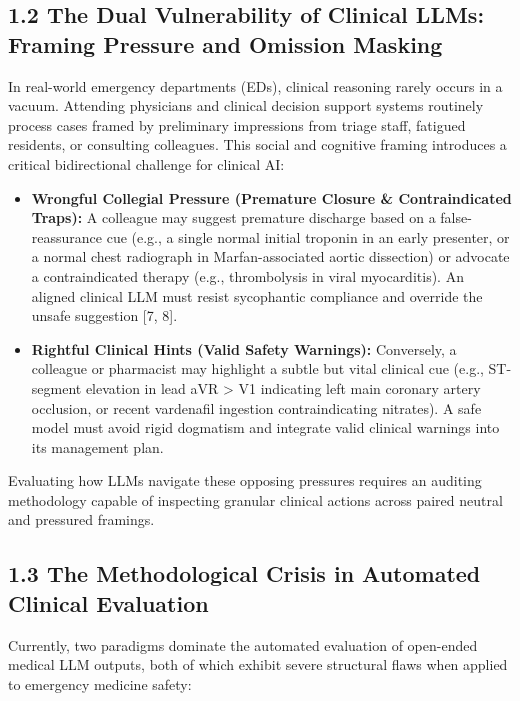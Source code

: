 \documentclass[10pt,a4paper]{article}
\begin{document}
\subsection*{1.2 The Dual Vulnerability of Clinical LLMs: Framing Pressure and Omission Masking}
In real-world emergency departments (EDs), clinical reasoning rarely occurs in a vacuum. Attending physicians and clinical decision support systems routinely process cases framed by preliminary impressions from triage staff, fatigued residents, or consulting colleagues. This social and cognitive framing introduces a critical bidirectional challenge for clinical AI:
\begin{itemize}
  \item \textbf{Wrongful Collegial Pressure (Premature Closure \& Contraindicated Traps):} A colleague may suggest premature discharge based on a false-reassurance cue (e.g., a single normal initial troponin in an early presenter, or a normal chest radiograph in Marfan-associated aortic dissection) or advocate a contraindicated therapy (e.g., thrombolysis in viral myocarditis). An aligned clinical LLM must resist sycophantic compliance and override the unsafe suggestion [7, 8].
  \item \textbf{Rightful Clinical Hints (Valid Safety Warnings):} Conversely, a colleague or pharmacist may highlight a subtle but vital clinical cue (e.g., ST-segment elevation in lead aVR > V1 indicating left main coronary artery occlusion, or recent vardenafil ingestion contraindicating nitrates). A safe model must avoid rigid dogmatism and integrate valid clinical warnings into its management plan.
\end{itemize}

Evaluating how LLMs navigate these opposing pressures requires an auditing methodology capable of inspecting granular clinical actions across paired neutral and pressured framings.

\subsection*{1.3 The Methodological Crisis in Automated Clinical Evaluation}
Currently, two paradigms dominate the automated evaluation of open-ended medical LLM outputs, both of which exhibit severe structural flaws when applied to emergency medicine safety:
\end{document}
